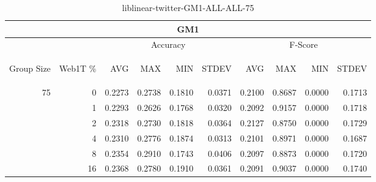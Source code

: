 \begin{center}
\begin{table}[htbp]
\begin{tabular}{ | r | r | r | r | r | r | r | r | r | r |}
\hline
\multicolumn{10}{|c|}{GM1}\\
\hline
 & & \multicolumn{4}{|c|}{Accuracy} & \multicolumn{4}{|c|}{F-Score}\\ \cline{3-10}
\begin{sideways}Group Size\end{sideways} & \begin{sideways}Web1T \%\end{sideways} & \begin{sideways}AVG\end{sideways} & \begin{sideways}MAX\end{sideways} & \begin{sideways}MIN\end{sideways} & \begin{sideways}STDEV\end{sideways} & \begin{sideways}AVG\end{sideways} & \begin{sideways}MAX\end{sideways} & \begin{sideways}MIN\end{sideways} & \begin{sideways}STDEV\end{sideways}\\
\hline
\multirow{6}{*}{75}
 & 0 & 0.2273 & 0.2738 & 0.1810 & 0.0371 & 0.2100 & 0.8687 & 0.0000 & 0.1713\\ \cline{2-10}
 & 1 & 0.2293 & 0.2626 & 0.1768 & 0.0320 & 0.2092 & 0.9157 & 0.0000 & 0.1718\\ \cline{2-10}
 & 2 & 0.2318 & 0.2730 & 0.1818 & 0.0364 & 0.2127 & 0.8750 & 0.0000 & 0.1729\\ \cline{2-10}
 & 4 & 0.2310 & 0.2776 & 0.1874 & 0.0313 & 0.2101 & 0.8971 & 0.0000 & 0.1687\\ \cline{2-10}
 & 8 & 0.2354 & 0.2910 & 0.1743 & 0.0406 & 0.2097 & 0.8873 & 0.0000 & 0.1720\\ \cline{2-10}
 & 16 & 0.2368 & 0.2780 & 0.1910 & 0.0361 & 0.2091 & 0.9037 & 0.0000 & 0.1740\\ \cline{2-10}
\hline
\end{tabular}
\caption{liblinear-twitter-GM1-ALL-ALL-75}
\end{table}
\end{center}

